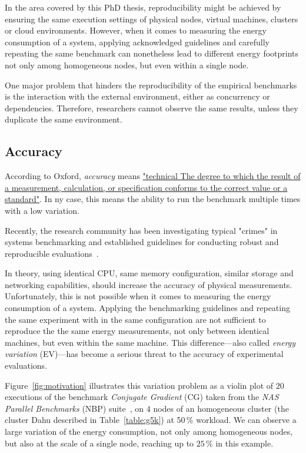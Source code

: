 In the area covered by this PhD thesis, reproducibility might be achieved by ensuring the same execution settings of physical nodes, virtual machines, clusters or cloud environments.
However, when it comes to measuring the energy consumption of a system, applying acknowledged guidelines and carefully repeating the same benchmark can nonetheless lead to different energy footprints not only among homogeneous nodes, but even within a single node.

One major problem that hinders the reproducibility of the empirical benchmarks is the interaction with the external environment, either as concurrency or dependencies.
Therefore, researchers cannot observe the same results, unless they duplicate the same environment.


\subsection{Accuracy}
According to Oxford, \emph{accuracy} means \href{https://www.lexico.com/definition/accuracy}{"technical The degree to which the result of a measurement, calculation, or specification conforms to the correct value or a standard"}.
In ny case, this means the ability to run the benchmark multiple times with a low variation.

Recently, the research community has been investigating typical "crimes" in systems benchmarking and established guidelines for conducting robust and reproducible evaluations~\cite{DBLP:journals/corr/abs-1801-02381}.

In theory, using identical CPU, same memory configuration, similar storage and networking capabilities, should increase the accuracy of physical measurements.
Unfortunately, this is not possible when it comes to measuring the energy consumption of a system.
Applying the benchmarking guidelines and repeating the same experiment with in the same configuration are not sufficient to reproduce the the same energy measurements, not only between identical machines, but even within the same machine.
This difference---also called \emph{energy variation} (EV)---has become a serious threat to the accuracy of experimental evaluations.

Figure~\ref{fig:motivation} illustrates this variation problem as a violin plot of $20$ executions of the benchmark \emph{Conjugate Gradient} (\textsf{CG}) taken from the \emph{NAS Parallel Benchmarks} (NBP) suite~\cite{Bailey:1991:NPB:125826.125925}, on $4$ nodes of an homogeneous cluster (the cluster \textsf{Dahu} described in Table~\ref{table:g5k}) at 50\,\% workload.
We can observe a large variation of the energy consumption, not only among homogeneous nodes, but also at the scale of a single node, reaching up to $25\,\%$ in this example.

